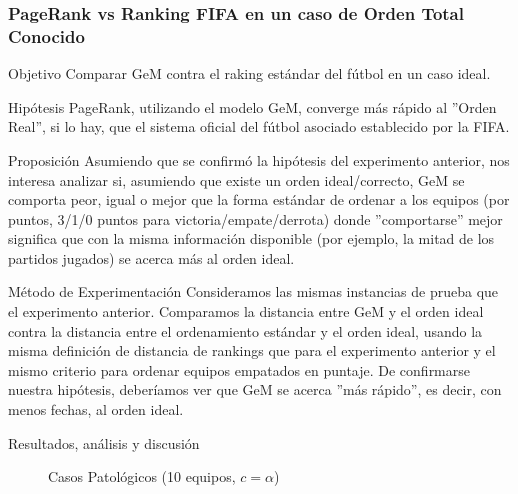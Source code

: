 \subsubsection{PageRank vs Ranking FIFA en un caso de Orden Total Conocido}
\label{subsec:exp5_aux}
\begin{LaTeXdescription}
    \item[Objetivo] Comparar GeM contra el raking est\'andar del f\'utbol en un
        caso ideal.\\

    \item[Hip\'otesis] PageRank, utilizando el modelo GeM, converge m\'as
        r\'apido al ''Orden Real'', si lo hay, que el sistema oficial del
        f\'utbol asociado establecido por la FIFA\cite{fifa}.\\

    \item[Proposici\'on] Asumiendo que se confirm\'o la hip\'otesis del
        experimento anterior, nos interesa analizar si, asumiendo que existe un
        orden ideal/correcto, GeM se comporta peor, igual o mejor que la forma
        est\'andar de ordenar a los equipos (por puntos, 3/1/0 puntos para
        victoria/empate/derrota) donde ''comportarse'' mejor significa que con
        la misma información disponible (por ejemplo, la mitad de los partidos
        jugados) se acerca m\'as al orden ideal.\\

    \item[M\'etodo de Experimentaci\'on] Consideramos las mismas instancias de
        prueba que el experimento anterior. Comparamos la distancia entre GeM y
        el orden ideal contra la distancia entre el ordenamiento est\'andar y el
        orden ideal, usando la misma definici\'on de distancia de rankings que
        para el experimento anterior y el mismo criterio para ordenar equipos
        empatados en puntaje. De confirmarse nuestra hip\'otesis, deber\'iamos
        ver que GeM se acerca ''m\'as r\'apido'', es decir, con menos fechas, al
        orden ideal.\\

    \item[Resultados, an\'alisis y discusi\'on] 
\end{LaTeXdescription}

\begin{figure}[H]
    \centering
    \caption{Casos Patol\'ogicos (10 equipos, $c = \alpha$)}
    \label{fig:exp5}
\end{figure}


